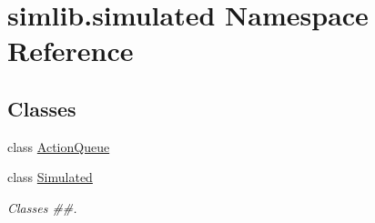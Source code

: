 \hypertarget{namespacesimlib_1_1simulated}{}\section{simlib.\+simulated Namespace Reference}
\label{namespacesimlib_1_1simulated}
\subsection*{Classes}
\begin{DoxyCompactItemize}
\item 
class \mbox{\hyperlink{classsimlib_1_1simulated_1_1_action_queue}{Action\+Queue}}
\item 
class \mbox{\hyperlink{classsimlib_1_1simulated_1_1_simulated}{Simulated}}
\begin{DoxyCompactList}\small\item\em Classes \#\#. \end{DoxyCompactList}\end{DoxyCompactItemize}
